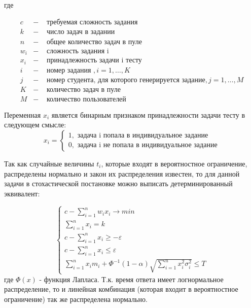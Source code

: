 где

$$
\begin{array}{lcl}
c & - & \mbox{ требуемая сложность задания}\\
k & - & \mbox{ число задач в задании}\\
n & - & \mbox{ общее количество задач в пуле}\\
w_i & - & \mbox{ сложность задания i }\\
x_i & - & \mbox{ принадлежность задачи i тесту}\\
i & - & \mbox{ номер задания }, i=1,\ldots,K\\
j & - & \mbox{ номер студента, для которого генерируется задание}, j=1,\ldots,M\\
K & - & \mbox{ количество задач в пуле}\\
M & - & \mbox{ количество пользователей}
\end{array}
$$

Переменная $x_i$ является бинарным признаком принадлежности задачи тесту в следующем смысле:
$$
x_i = 
\left\{
\begin{array}{ll}
1, \mbox{ задача i попала в индивидуальное задание}\\
0, \mbox{ задача i не попала в индивидуальное задание}
\end{array}
\right.
$$

Так как случайные величины $t_{i}$, которые входят в вероятностное ограни\-чение,  распределены нормально и закон их распределения известен, то для данной задачи в стохастической по\-становке можно выписать детерминиро\-ванный эквивалент\cite{38.}:

$$
\left \{
\begin{array}{l}
c-\sum\limits_{i=1}^{n}w_ix_i \rightarrow min \\
\sum\limits_{i=1}^{n} x_i = k \\
c - \sum\limits_{i=1}^{n} x_i \ge - \varepsilon \\
c - \sum\limits_{i=1}^{n} x_i \le \varepsilon \\
\sum\limits_{i=1}^{n} x_{i}m_{i}  + \Phi^{-1}(1-\alpha)\sqrt{\sum\limits_{i=1}^{n} x_{i}^{2}\sigma^{2}_{i}} \le T 
\end{array}
\right.
$$
где $\Phi(x)$ - функция Лапласа. Т.к. время ответа имеет логнормальное распре\-деление, то и линейная комбинация (которая входит в вероятностное ограниче\-ние) так же распре\-делена нормально.